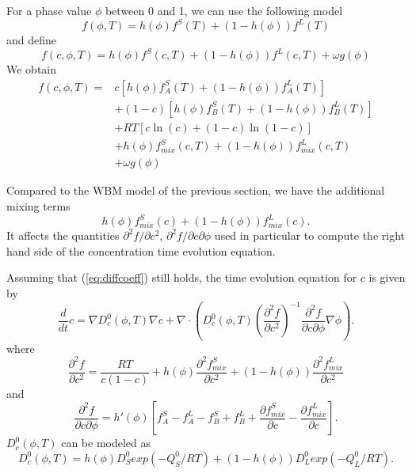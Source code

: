 For a phase value $\phi$ between 0 and 1, we can use the following model
%
\begin{equation}
  f(\phi,T)=h(\phi)f^S(T)+(1-h(\phi))f^L(T)
\end{equation}
%
and define
%
\begin{equation}
  f(c,\phi,T)=h(\phi)f^{S}(c,T)+(1-h(\phi))f^{L}(c,T)+\omega g(\phi)
\end{equation}
%
We obtain
%
\begin{equation}
\begin{split}
  f(c,\phi,T) = {} &
  c \left[h(\phi)f_A^{S}(T)+(1-h(\phi))f_A^{L}(T) \right] \\
  & + (1-c)\left[h(\phi)f_B^{S}(T)+(1-h(\phi))f_B^{L}(T) \right] \\
  & + RT[c\ln(c)+(1-c)\ln(1-c)] \\
  & + h(\phi)f^S_{mix}(c,T)+(1-h(\phi))f^{L}_{mix}(c,T) \\
  & + \omega g(\phi)
\end{split}
\end{equation}

Compared to the WBM model of the previous section, we have the additional
mixing terms
%
\begin{equation}
  h(\phi)f^S_{mix}(c)+(1-h(\phi))f^{L}_{mix}(c).
\end{equation}
%
It affects the quantities
$\partial^2 f/\partial c^2$, 
$\partial^2 f/\partial c \partial\phi$ used in particular to compute
the right hand side of the concentration time evolution equation.

Assuming that 
(\ref{eq:diffcoeff})
still holds, the time evolution equation for $c$ is given by
%
\begin{equation}
  \frac{d}{dt}c
  =\nabla D_c^0(\phi,T)\nabla c 
  + \nabla\cdot\left(
  D_c^0(\phi,T)\left(\frac{\partial^2 f}{\partial c^2}\right)^{-1}
  \frac{\partial^2 f}{\partial c \partial\phi}
  \nabla\phi\right).
\end{equation}
%
where
%
\begin{equation}
  \frac{\partial^2 f}{\partial c^2}=
  \frac{RT}{c(1-c)}
  +h(\phi)\frac{\partial^2 f^S_{mix}}{\partial c^2}
  +(1-h(\phi))\frac{\partial^2 f^L_{mix}}{\partial c^2}
\end{equation}
%
and
%
\begin{equation}
  \frac{\partial^2 f}{\partial c\partial\phi}=
  h'(\phi)
  \left[
  f_A^S-f_A^L-f_B^S+f_B^L
  +\frac{\partial f^S_{mix}}{\partial c}-\frac{\partial f^L_{mix}}{\partial c}
  \right].
\end{equation}
%
$D_c^0(\phi,T)$ can be modeled as
%
\begin{equation}
  D_c^0(\phi,T)=h(\phi) D^0_S exp(-Q^0_S/RT)
  +(1-h(\phi)) D^0_L exp(-Q^0_L/RT).
\end{equation}

